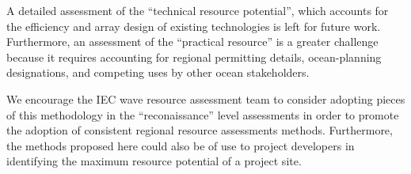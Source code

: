 A detailed assessment of the ``technical resource potential'', which accounts for the efficiency and array design of existing technologies is left for future work. Furthermore, an assessment of the ``practical resource'' is a greater challenge because it requires accounting for regional permitting details, ocean-planning designations, and competing uses by other ocean stakeholders.

We encourage the IEC wave resource assessment team to consider adopting pieces of this methodology in the ``reconaissance'' level assessments in order to promote the adoption of consistent regional resource assessments methods. Furthermore, the methods proposed here could also be of use to project developers in identifying the maximum resource potential of a project site. 


